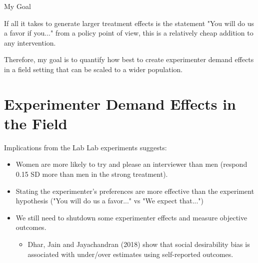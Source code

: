 \documentclass[aspectratio=169,xcolor=dvipsnames]{beamer}
\begin{document}
\begin{frame}{My Goal}

    If all it takes to generate larger treatment effects is the 
    statement "You will do us a favor if you..." from a policy point of view, this is a relatively cheap addition to any 
    intervention.

    \vfill
    Therefore, my goal is to quantify how best to create experimenter demand effects in a field 
    setting that can be scaled to a wider population. 

\end{frame}

\section{Experimenter Demand Effects in the Field}



\begin{frame}{Implications from the Lab}
    Lab experiments suggests:
    \begin{itemize}
            \item Women are more likely to try and please an interviewer than men (respond 0.15 SD 
            more than men in the strong treatment).
            \item Stating the experimenter's preferences are more effective than the 
            experiment hypothesis ("You will do us a favor..." vs "We expect that...")
            \item We still need to shutdown some experimenter effects and measure objective outcomes.
            \begin{itemize}
                \item Dhar, Jain and Jayachandran (2018) show that social desirability bias is 
                associated with under/over estimates using self-reported outcomes. 
            \end{itemize}
    \end{itemize}
\end{frame}



\end{document}
